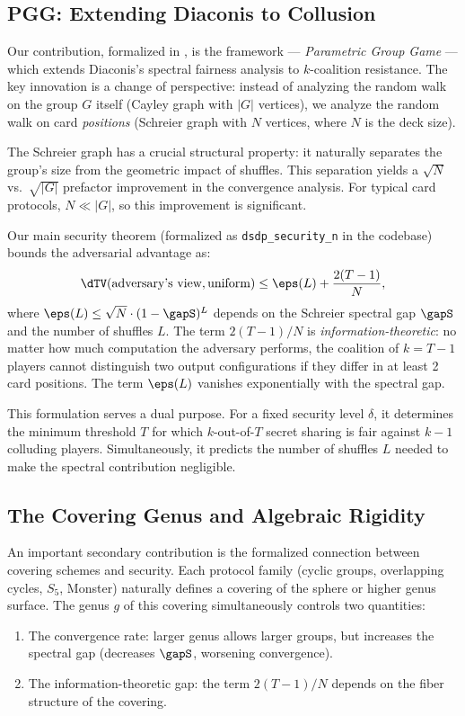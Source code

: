 \documentclass[11pt,a4paper]{article}
\begin{document}
\subsection*{PGG: Extending Diaconis to Collusion}

Our contribution, formalized in \Rocq, is the \pgg framework — \textit{Parametric Group Game} — which extends Diaconis's spectral fairness analysis to $k$-coalition resistance.
The key innovation is a change of perspective: instead of analyzing the random walk on the group $G$ itself (Cayley graph with $|G|$ vertices), we analyze the random walk on card \emph{positions} (Schreier graph with $N$ vertices, where $N$ is the deck size).

The Schreier graph has a crucial structural property: it naturally separates the group's size from the geometric impact of shuffles.
This separation yields a $\sqrt{N}$ vs.\ $\sqrt{|G|}$ prefactor improvement in the convergence analysis.
For typical card protocols, $N \ll |G|$, so this improvement is significant.

Our main security theorem (formalized as \texttt{dsdp\_security\_n} in the \Rocq codebase) bounds the adversarial advantage as:
\[
  \dTV(\text{adversary's view}, \text{uniform}) \leq \eps(L) + \frac{2(T-1)}{N},
\]
where $\eps(L) \leq \sqrt{N} \cdot (1 - \gapS)^L$ depends on the Schreier spectral gap $\gapS$ and the number of shuffles $L$.
The term $2(T-1)/N$ is \emph{information-theoretic}: no matter how much computation the adversary performs, the coalition of $k = T-1$ players cannot distinguish two output configurations if they differ in at least 2 card positions.
The term $\eps(L)$ vanishes exponentially with the spectral gap.

This formulation serves a dual purpose.
For a fixed security level $\delta$, it determines the minimum threshold $T$ for which $k$-out-of-$T$ secret sharing is fair against $k-1$ colluding players.
Simultaneously, it predicts the number of shuffles $L$ needed to make the spectral contribution negligible.

\subsection*{The Covering Genus and Algebraic Rigidity}

An important secondary contribution is the formalized connection between covering schemes and security.
Each protocol family (cyclic groups, overlapping cycles, $S_5$, Monster) naturally defines a covering of the sphere or higher genus surface.
The genus $g$ of this covering simultaneously controls two quantities:
\begin{enumerate}
  \item The convergence rate: larger genus allows larger groups, but increases the spectral gap (decreases $\gapS$, worsening convergence).
  \item The information-theoretic gap: the term $2(T-1)/N$ depends on the fiber structure of the covering.
\end{enumerate}
\end{document}
